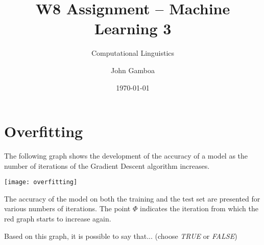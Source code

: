 \documentclass[a4paper,11pt]{scrartcl}
\title{W8 Assignment -- Machine Learning 3}
\subtitle{Computational Linguistics}
\author{John Gamboa}
\date{\today}
\begin{document}
\maketitle

\section{Overfitting}

The following graph shows the development of the accuracy of a model as the
number of iterations of the Gradient Descent algorithm increases.

\texttt{[image: overfitting]}


The accuracy of the model on both the training and the test set are presented
for various numbers of iterations. The point $\Phi$ indicates the iteration
from which the red graph starts to increase again.

Based on this graph, it is possible to say that...
(choose \textit{TRUE} or \textit{FALSE})
\end{document}
